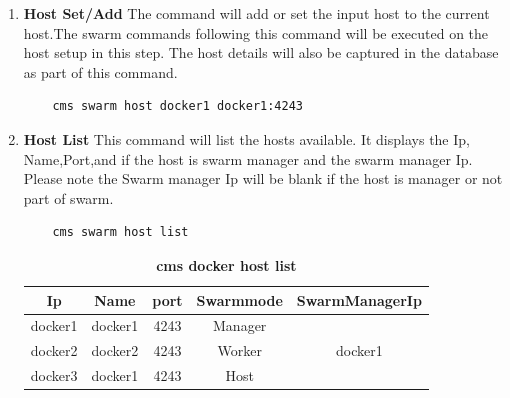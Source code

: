 \documentclass[9pt,twocolumn,twoside]{../../styles/osajnl}
\begin{document}
\begin{enumerate}
    \item \textbf{Host Set/Add}
     The command will add or set the input host to the current host.The swarm commands following this command will be executed on the host setup in this step. The host details will also be captured in the database as part of this command.  
    \begin{verbatim}
    cms swarm host docker1 docker1:4243
    \end{verbatim} 
    \item \textbf{Host List}
     This command will list the hosts available. It displays the Ip, Name,Port,and if the host is swarm manager and the swarm manager Ip. Please note the Swarm manager Ip will be blank if the host is manager or not part of swarm.    
    \begin{verbatim}
    cms swarm host list
    \end{verbatim} 
     \begin{table}[htbp]
     \caption{\bf cms docker host list }
     \begin{tabular}{ccccc}
     \hline
      Ip & Name & port & Swarmmode &SwarmManagerIp\\
      \hline
      docker1 & docker1 & 4243 & Manager & \\
      docker2 & docker2 & 4243 & Worker & docker1\\
      docker3 & docker1 & 4243 & Host & \\
     \hline
     \end{tabular}
     \label{tab:tab5}
     \end{table}
     

\end{enumerate}
\end{document}
